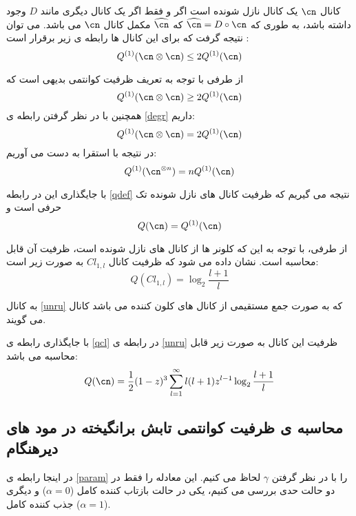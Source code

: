 کانال 
$\cn$
یک کانال نازل شونده
است اگر و فقط اگر یک کانال دیگری مانند
$D$
وجود داشته باشد، به طوری که 
$\widehat{\cn} = D \circ \cn$
که 
$\widehat{\cn}$
مکمل کانال 
$\cn$
می باشد. می توان نتیجه گرفت که برای این کانال ها رابطه ی زیر برقرار است
\cite{chuang,wilde}
:
\begin{equation} \label{degr}
		Q^{(1)} (\cn \otimes \cn) \leq 2 Q^{(1)} (\cn)
\end{equation}

از طرفی با توجه به تعریف ظرفیت کوانتمی بدیهی است که 
\begin{equation}
	Q^{(1)} (\cn \otimes \cn) \geq 2 Q^{(1)} (\cn)
\end{equation}
 همچنین با در نظر گرفتن رابطه ی
\ref{degr}
داریم:
\begin{equation}
	Q^{(1)}(\cn \otimes \cn) = 2 Q^{(1)} (\cn)
\end{equation}
در نتیجه با استقرا به دست می آوریم:
\begin{equation}
Q^{(1)}(\cn ^{\otimes n}) = n Q^{(1)} (\cn)
\end{equation}

با جایگذاری این در رابطه 
\ref{qdef}
نتیجه می گیریم که ظرفیت کانال های  نازل شونده
تک حرفی است و
\begin{equation}
	Q(\cn) = Q^{(1)} (\cn)
\end{equation}

از طرفی، با توجه به این که کلونر ها از کانال های نازل شونده
است، ظرفیت آن قابل محاسبه است. نشان داده می شود که ظرفیت کانال
$Cl_{1,l}$
به صورت زیر است:
\begin{equation} \label{qcl}
	Q(Cl_{1,l}) = \log_2 \frac{l+1}{l}
\end{equation}

به کانال
\ref{unru}
که به صورت جمع مستقیمی از کانال های کلون کننده می باشد کانال
می گویند.

با جایگذاری  رابطه ی
\ref{qcl}
در رابطه ی 
\ref{unru}
ظرفیت این کانال 
به صورت زیر قابل محاسبه می باشد:
\begin{equation} \label{unrq}
	Q(\cn) = \frac{1}{2} (1-z)^3 \sum_{l=1}^{\infty} l (l+1) z^{l-1} \log_2 \frac{l+1}{l}
\end{equation}
\subsection{محاسبه ی ظرفیت کوانتمی تابش برانگیخته در مود های دیرهنگام} %
در اینجا رابطه ی 
\ref{param}
را با در نظر گرفتن
$\gamma$
لحاظ می کنیم. این معادله را فقط در دو حالت حدی بررسی می کنیم، یکی در حالت بازتاب کننده کامل 
($\alpha = 0$)
و دیگری جذب کننده کامل
($\alpha = 1$).

